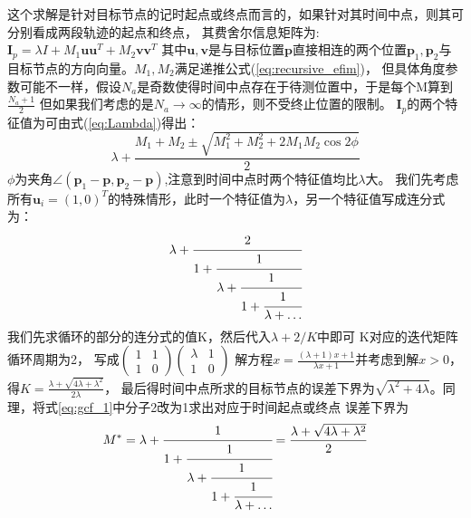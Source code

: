 这个求解是针对目标节点的记时起点或终点而言的，如果针对其时间中点，则其可分别看成两段轨迹的起点和终点，
其费舍尔信息矩阵为:$\bm{I}_p=\lambda I+M_1\bm{u}\bm{u}^T+M_2\bm{v}\bm{v}^T$
其中$\bm{u},\bm{v}$是与目标位置$\bm{p}$直接相连的两个位置$\bm{p}_1,\bm{p}_2$与目标节点的方向向量。$M_1,M_2$满足递推公式(\ref{eq:recursive_efim})，
但具体角度参数可能不一样，假设$N_a$是奇数使得时间中点存在于待测位置中，于是每个M算到$\frac{N_a+1}{2}$
但如果我们考虑的是$N_a\to \infty$的情形，则不受终止位置的限制。
$\bm{I}_p$的两个特征值为可由式(\ref{eq:Lambda})得出：
\[
\lambda+\frac{M_1+M_2\pm \sqrt{M_1^2+M_2^2+2M_1M_2\cos2\phi}}{2}
\]
$\phi$为夹角$\angle(\bm{p}_1-\bm{p},\bm{p}_2-\bm{p})$,注意到时间中点时两个特征值均比$\lambda$大。
我们先考虑所有$\bm{u}_i=(1,0)^T$的特殊情形，此时一个特征值为$\lambda$，另一个特征值写成连分式为：
\begin{equation}\label{eq:gcf_1}
\lambda+\cfrac{2}{1+\cfrac{1}{\lambda+\cfrac{1}{1+\cfrac{1}{\lambda+\dots}}}}
\end{equation}
我们先求循环的部分的连分式的值K，然后代入$\lambda+2/K$中即可
K对应的迭代矩阵循环周期为2，
写成$\begin{pmatrix}1 & 1 \\1 & 0\end{pmatrix}\begin{pmatrix}\lambda & 1 \\1 & 0\end{pmatrix}$
解方程$x=\frac{(\lambda+1)x+1}{\lambda x+1}$并考虑到解$x>0$，得$K=\frac{\lambda+\sqrt{4\lambda+\lambda^2}}{2\lambda}$，
最后得时间中点所求的目标节点的误差下界为$\sqrt{\lambda^2+4\lambda}$。同理，将式\ref{eq:gcf_1}中分子2改为1求出对应于时间起点或终点
误差下界为
\begin{equation}\label{eq:starting_or_ending}
M^*=\lambda+\cfrac{1}{1+\cfrac{1}{\lambda+\cfrac{1}{1+\cfrac{1}{\lambda+\dots}}}}
=\frac{\lambda+\sqrt{4\lambda+\lambda^2}}{2}
\end{equation}

